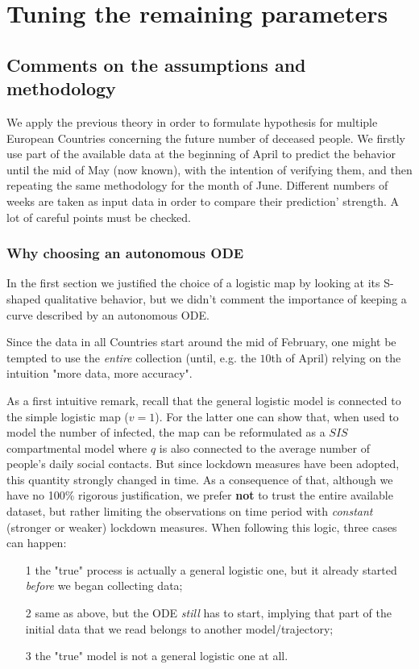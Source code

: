 \documentclass[8pt]{article}
\begin{document}
\section{Tuning the remaining parameters}

\subsection{Comments on the assumptions and methodology}
We apply the previous theory in order to formulate hypothesis 
for multiple European Countries concerning the future number of
deceased people. We firstly use part of the available data at the beginning
of April to predict the behavior until the mid of May (now known),
with the intention of verifying them, and then
repeating the same methodology for the month of June.
Different numbers of weeks
are taken as input data in order to compare their prediction' strength.
A lot of careful points must be checked.


\subsubsection{Why choosing an autonomous ODE}
In the first section we justified the choice of a logistic map by looking
at its S-shaped qualitative behavior, but we didn't comment the
importance of keeping
a curve described by an autonomous ODE.


Since the data in all Countries start around the mid
of February, one might be tempted to use the \emph{entire}
collection (until, e.g. the $10$th of April)
relying on the intuition "more data, more accuracy".


As a first intuitive remark,
recall that the general logistic model is connected to the simple
logistic map ($v = 1$). For the latter one can show that,
when used to model the number of infected,
the map can be reformulated as a $SIS$ compartmental model
where $q$ is also connected to the average number of people's
daily social contacts.
But since lockdown measures have been adopted, this quantity
strongly changed in time. As a consequence of that, although
we have no 100\% rigorous justification,
we prefer \textbf{not} to trust the entire available dataset, but rather
limiting the observations on time period with
\emph{constant} (stronger or weaker) lockdown measures.
When following this logic, three cases can happen:
\begin{itemize}
	\item[1] the "true" process is actually a general logistic one,
		but it already started \emph{before} we began collecting data;
	\item[2] same as above, but the ODE \emph{still} has
		to start, implying that part of the
		initial data that we read belongs to
		another model/trajectory;
	\item[3] the "true" model is not a general logistic one at all.
\end{itemize}
\end{document}
